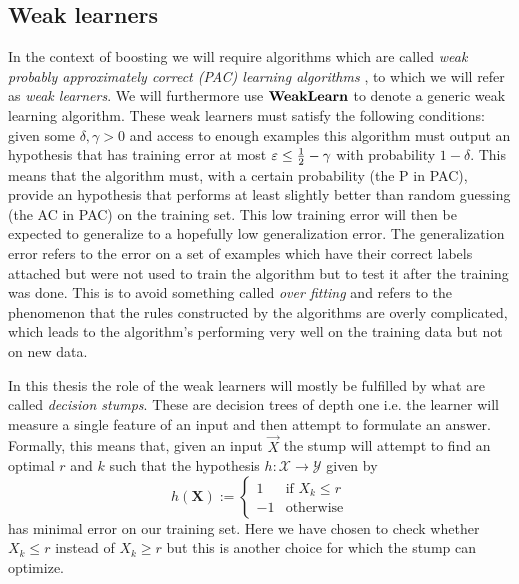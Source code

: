 \subsection{Weak learners}
\label{subsec:weak}
In the context of boosting we will require algorithms which are called \textit{weak probably approximately correct (PAC) learning algorithms} \cite{Freund1997}, to which we will refer as \textit{weak learners}. We will furthermore use $\textbf{WeakLearn}$ to denote a generic weak learning algorithm. These weak learners must satisfy the following conditions: given some $\delta,\gamma >0$ and access to enough examples this algorithm must output an hypothesis that has training error at most $\varepsilon \leq \frac12 - \gamma$ with probability $1-\delta$. This means that the algorithm must, with a certain probability (the P in PAC), provide an hypothesis that performs at least slightly better than random guessing (the AC in PAC) on the training set. This low training error will then be expected to generalize to a hopefully low generalization error. The generalization error refers to the error on a set of examples which have their correct labels attached but were not used to train the algorithm but to test it after the training was done. This is to avoid something called \textit{over fitting} and refers to the phenomenon that the rules constructed by the algorithms are overly complicated, which leads to the algorithm's performing very well on the training data but not on new data. 

\par In this thesis the role of the weak learners will mostly be fulfilled by what are called \textit{decision stumps}. These are decision trees of depth one i.e. the learner will measure a single feature of an input and then attempt to formulate an answer. Formally, this means that, given an input $\vec X$ the stump will attempt to find an optimal $r$ and $k$ such that the hypothesis $h:\mathcal X \to \mathcal Y$ given by $$h(\mathbf X):= \begin{cases}1 &\text{if } X_k \leq r\\-1&\text{otherwise}\end{cases}$$ has minimal error on our training set. Here we have chosen to check whether $X_k\leq r$ instead of $X_k\geq r$ but this is another choice for which the stump can optimize. 

